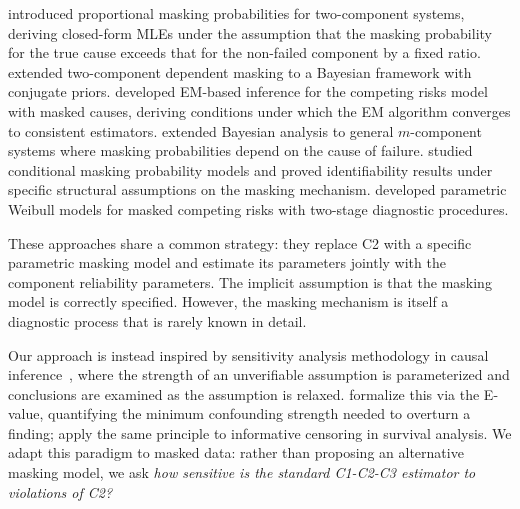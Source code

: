 \citet{LinGuess1994} introduced proportional masking probabilities for
two-component systems, deriving closed-form MLEs under the assumption that the
masking probability for the true cause exceeds that for the non-failed
component by a fixed ratio. \citet{Guttman1995} extended two-component
dependent masking to a Bayesian framework with conjugate priors.
\citet{craiu2004inference} developed EM-based inference for the competing risks
model with masked causes, deriving conditions under which the EM algorithm
converges to consistent estimators. \citet{Mukhopadhyay2006} extended
Bayesian analysis to general $m$-component systems where masking probabilities
depend on the cause of failure. \citet{CraiuReiser2006} studied conditional
masking probability models and proved identifiability results under specific
structural assumptions on the masking mechanism. \citet{flehinger2002parametric}
developed parametric Weibull models for masked competing risks with two-stage
diagnostic procedures.

These approaches share a common strategy: they replace C2 with a specific
parametric masking model and estimate its parameters jointly with the
component reliability parameters. The implicit assumption is that the masking
model is correctly specified. However, the masking mechanism is itself a
diagnostic process that is rarely known in detail.

Our approach is instead inspired by sensitivity analysis methodology in causal
inference~\citep{rosenbaum2002observational}, where the strength of an
unverifiable assumption is parameterized and conclusions are examined as the
assumption is relaxed. \citet{vanderweele2017sensitivity} formalize this via the
E-value, quantifying the minimum confounding strength needed to overturn a
finding; \citet{siannis2004applications} apply the same principle to informative
censoring in survival analysis. We adapt this paradigm to masked data: rather
than proposing an alternative masking model, we ask \emph{how sensitive is the
standard C1-C2-C3 estimator to violations of C2?}
